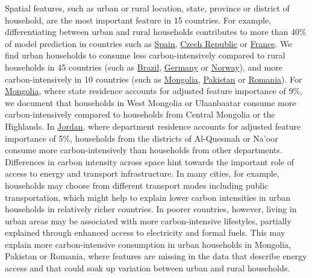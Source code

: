 \documentclass[12pt, a4paper]{article}
\begin{document}
Spatial features, such as urban or rural location, state, province or district of household, are the most important feature in 15 countries. For example, differentiating between urban and rural households contributes to more than 40\% of model prediction in countries such as \hyperref[fig:5b_ESP]{Spain}, \hyperref[fig:5b_CZE]{Czech Republic} or \hyperref[fig:5b_FRA]{France}. We find urban households to consume less carbon-intensively compared to rural households in 45 countries (such as \hyperref[fig:5b_BRA]{Brazil}, \hyperref[fig:5b_DEU]{Germany} or \hyperref[fig:5b_NOR]{Norway}), and more carbon-intensively in 10 countries (such as \hyperref[fig:5b_MNG]{Mongolia}, \hyperref[fig:5b_PAK]{Pakistan} or \hyperref[fig:5b_ROU]{Romania}). For \hyperref[fig:5b_MNG]{Mongolia}, where state residence accounts for adjusted feature importance of 9\%, we document that households in West Mongolia or Ulaanbaatar consume more carbon-intensively compared to households from Central Mongolia or the Highlands. In \hyperref[fig:5b_JOR]{Jordan}, where department residence accounts for adjusted feature importance of 5\%, households from the districts of Al-Quesmah or Na'oor consume more carbon-intensively than households from other departments. Differences in carbon intensity across space hint towards the important role of access to energy and transport infrastructure. In many cities, for example, households may choose from different transport modes including public transportation, which might help to explain lower carbon intensities in urban households in relatively richer countries. In poorer countries, however, living in urban areas may be associated with more carbon-intensive lifestyles, partially explained through enhanced access to electricity and formal fuels. This may explain more carbon-intensive consumption in urban households in Mongolia, Pakistan or Romania, where features are missing in the data that describe energy access and that could soak up variation between urban and rural households.
\end{document}
